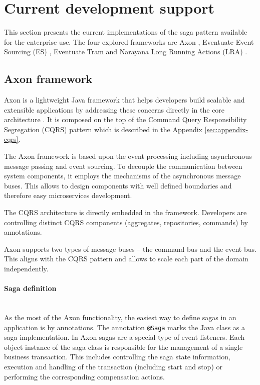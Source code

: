 \documentclass[oneside,
  digital, %
  table,   %
  nolof,     %
  nolot,     %
]{fithesis3}
\newcommand{\newlinepar}[1]{\paragraph{#1}\needspace{4\baselineskip}\mbox{}\\}
\begin{document}
\section{Current development support}

This section presents the current implementations of the saga pattern available for the enterprise use. The four explored frameworks are Axon \cite{axon_framework}, Eventuate Event Sourcing (ES) \cite{eventuate.io}, Eventuate Tram \cite{eventuate-tram} and Narayana Long Running Actions (LRA) \cite{narayana_lra}.

\subsection{Axon framework}

Axon is a lightweight Java framework that helps developers build scalable and extensible applications by addressing these concerns directly in the core architecture \cite{axon_framework}. It is composed on the top of the Command Query Responsibility Segregation (CQRS) pattern which is described in the Appendix \ref{sec:appendix-cqrs}.

The Axon framework is based upon the event processing including asynchronous message passing and event sourcing. To decouple the communication between system components, it employs the mechanisms of the asynchronous message buses. This allows to design components with well defined boundaries and therefore easy microservices development.

The CQRS architecture is directly embedded in the framework. Developers are controlling distinct CQRS components (aggregates, repositories, commands) by annotations. 

Axon supports two types of message buses -- the command bus and the event bus. This aligns with the CQRS pattern and allows to scale each part of the domain independently.

\newlinepar{Saga definition}

As the most of the Axon functionality, the easiest way to define sagas in an application is by annotations. The annotation \texttt{@Saga} marks the Java class as a saga implementation. In Axon sagas are a special type of event listeners. Each object instance of the saga class is responsible for the management of a single business transaction. This includes controlling the saga state information, execution and handling of the transaction (including start and stop) or performing the corresponding compensation actions.
\end{document}
